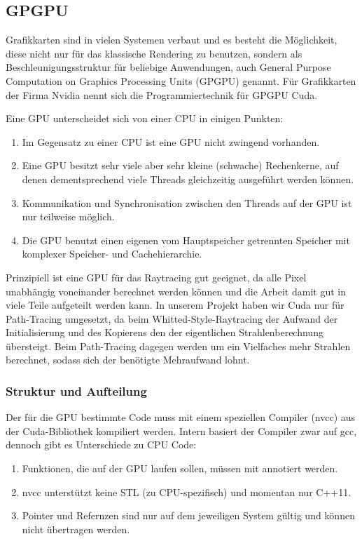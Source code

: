 \subsection{GPGPU}

Grafikkarten sind in vielen Systemen verbaut und es besteht die Möglichkeit, diese nicht nur für das klassische Rendering zu benutzen, sondern als Beschleunigungsstruktur für beliebige Anwendungen, auch General Purpose Computation on Graphics Processing Units (GPGPU) genannt. 
Für Grafikkarten der Firma Nvidia nennt sich die Programmiertechnik für GPGPU Cuda. 

Eine GPU unterscheidet sich von einer CPU in einigen Punkten:
\begin{enumerate}
\item Im Gegensatz zu einer CPU ist eine GPU nicht zwingend vorhanden. 
\item Eine GPU besitzt sehr viele aber sehr kleine (schwache) Rechenkerne, auf denen dementsprechend viele Threads gleichzeitig ausgeführt werden können. 
\item Kommunikation und Synchronisation zwischen den Threads auf der GPU ist nur teilweise möglich. 
\item Die GPU benutzt einen eigenen vom Hauptspeicher getrennten Speicher mit komplexer Speicher- und Cachehierarchie. 
\end{enumerate}

Prinzipiell ist eine GPU für das Raytracing gut geeignet, da alle Pixel unabhängig voneinander berechnet werden können und die Arbeit damit gut in viele Teile aufgeteilt werden kann. 
In unserem Projekt haben wir Cuda nur für Path-Tracing umgesetzt, da beim Whitted-Style-Raytracing der Aufwand der Initialisierung und des Kopierens den der eigentlichen Strahlenberechnung übersteigt. 
Beim Path-Tracing dagegen werden um ein Vielfaches mehr Strahlen berechnet, sodass sich der benötigte Mehraufwand lohnt. 


\subsubsection{Struktur und Aufteilung}

Der für die GPU bestimmte Code muss mit einem speziellen Compiler (nvcc) aus der Cuda-Bibliothek kompiliert werden. Intern basiert der Compiler zwar auf gcc, dennoch gibt es Unterschiede zu CPU Code:

\begin{enumerate}
\item Funktionen, die auf der GPU laufen sollen, müssen mit  annotiert werden. 
\item nvcc unterstützt keine STL (zu CPU-spezifisch) und momentan nur C++11. 
\item Pointer und Refernzen sind nur auf dem jeweiligen System gültig und können nicht übertragen werden. 
\end{enumerate}


